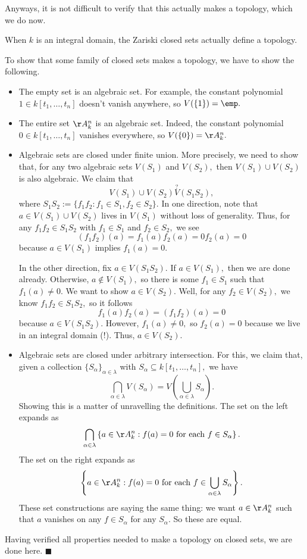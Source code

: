 Anyways, it is not difficult to verify that this actually makes a topology, which we do now.
\begin{proposition}
    When $k$ is an integral domain, the Zariski closed sets actually define a topology.
\end{proposition}
To show that some family of closed sets makes a topology, we have to show the following.
\begin{itemize}
    \item The empty set is an algebraic set. For example, the constant polynomial $1\in k[t_1,\ldots,t_n]$ doesn't vanish anywhere, so $V(\{1\})=\emp.$
    \item The entire set $\AA_k^n$ is an algebraic set. Indeed, the constant polynomial $0\in k[t_1,\ldots,t_n]$ vanishes everywhere, so $V(\{0\})=\AA_k^n.$
    \item Algebraic sets are closed under finite union. More precisely, we need to show that, for any two algebraic sets $V(S_1)$ and $V(S_2),$ then $V(S_1)\cup V(S_2)$ is also algebraic. We claim that
    \[V(S_1)\cup V(S_2)\stackrel?V(S_1S_2),\]
    where $S_1S_2:=\{f_1f_2:f_1\in S_1,f_2\in S_2\}.$ In one direction, note that $a\in V(S_1)\cup V(S_2)$ lives in $V(S_1)$ without loss of generality. Thus, for any $f_1f_2\in S_1S_2$ with $f_1\in S_1$ and $f_2\in S_2,$ we see
    \[(f_1f_2)(a)=f_1(a)f_2(a)=0f_2(a)=0\]
    because $a\in V(S_1)$ implies $f_1(a)=0.$
    
    In the other direction, fix $a\in V(S_1S_2).$ If $a\in V(S_1),$ then we are done already. Otherwise, $a\notin V(S_1),$ so there is some $f_1\in S_1$ such that $f_1(a)\ne0.$ We want to show $a\in V(S_2).$ Well, for any $f_2\in V(S_2),$ we know $f_1f_2\in S_1S_2,$ so it follows
    \[f_1(a)f_2(a)=(f_1f_2)(a)=0\]
    because $a\in V(S_1S_2).$ However, $f_1(a)\ne0,$ so $f_2(a)=0$ because we live in an integral domain (!). Thus, $a\in V(S_2).$
    
    \item Algebraic sets are closed under arbitrary intersection. For this, we claim that, given a collection $\{S_\alpha\}_{\alpha\in\lambda}$ with $S_\alpha\subseteq k[t_1,\ldots,t_n],$ we have
    \[\bigcap_{\alpha\in\lambda}V(S_\alpha)=V\left(\bigcup_{\alpha\in\lambda}S_\alpha\right).\]
    Showing this is a matter of unravelling the definitions. The set on the left expands as
    \[\bigcap_{\alpha\in\lambda}\left\{a\in\AA_k^n:f(a)=0\text{ for each }f\in S_\alpha\right\}.\]
    The set on the right expands as
    \[\left\{a\in\AA_k^n:f(a)=0\text{ for each }f\in\bigcup_{\alpha\in\lambda}S_\alpha\right\}.\]
    These set constructions are saying the same thing: we want $a\in\AA_k^n$ such that $a$ vanishes on any $f\in S_\alpha$ for any $S_\alpha.$ So these are equal.
\end{itemize}
Having verified all properties needed to make a topology on closed sets, we are done here. $\blacksquare$

